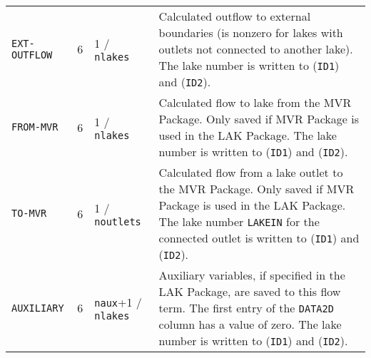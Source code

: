 \begin{longtable}{p{3.5cm} p{2cm} p{3.5cm} p{6.5cm}}
\texttt{EXT-OUTFLOW} & 6 & 1 / \texttt{nlakes} & Calculated outflow to external boundaries (is nonzero for lakes with outlets not connected to another lake). The lake number is written to (\texttt{ID1}) and (\texttt{ID2}). \\
\texttt{FROM-MVR} & 6 & 1 / \texttt{nlakes} & Calculated flow to lake from the MVR Package. Only saved if MVR Package is used in the LAK Package. The lake number is written to (\texttt{ID1}) and (\texttt{ID2}). \\
\texttt{TO-MVR} & 6 & 1 / \texttt{noutlets} & Calculated flow from a lake outlet to the MVR Package. Only saved if MVR Package is used in the LAK Package. The lake number \texttt{LAKEIN} for the connected outlet is written to (\texttt{ID1}) and (\texttt{ID2}). \\
\texttt{AUXILIARY} & 6 & \texttt{naux}+1 / \texttt{nlakes} & Auxiliary variables, if specified in the LAK Package, are saved to this flow term. The first entry of the \texttt{DATA2D} column has a value of zero. The lake number is written to (\texttt{ID1}) and (\texttt{ID2}).
\label{table:binarylak}
\end{longtable}


